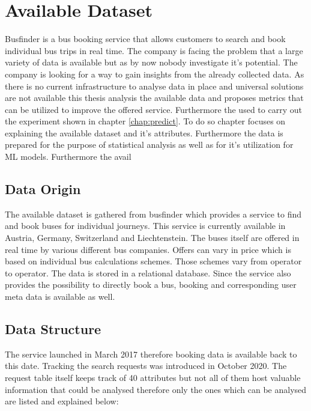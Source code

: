 %
%
% 
% 
% 

\chapter{Available Dataset}
\label{chap:available_dataset}
Busfinder is a bus booking service that allows customers to search and book individual bus trips in real time. The company is facing the problem that a large variety of data is available but as by now nobody investigate it's potential. The company is looking for a way to gain insights from the already collected data. As there is no current infrastructure to analyse data in place and universal solutions are not available this thesis analysis the available data and proposes metrics that can be utilized to improve the offered service. Furthermore the used to carry out the experiment shown in chapter \ref{chap:predict}. To do so chapter focuses on explaining the available dataset and it's attributes. Furthermore the data is prepared for the purpose of statistical analysis as well as for it's utilization for ML models. Furthermore the avail

\section{Data Origin}
The available dataset is gathered from busfinder which provides a service to find and book buses for individual journeys. This service is currently available in Austria, Germany, Switzerland and Liechtenstein. The buses itself are offered in real time by various different bus companies. Offers can vary in price which is based on individual bus calculations schemes. Those schemes vary from operator to operator. The data is stored in a relational database. Since the service also provides the possibility to directly book a bus, booking and corresponding user meta data is available as well. \newline

\section{Data Structure}
The service launched in March 2017 therefore booking data is available back to this date. Tracking the search requests was introduced in October 2020. 
The request table itself keeps track of 40 attributes but not all of them host valuable information that could be analysed therefore only the ones which can be analysed are listed and explained below:

